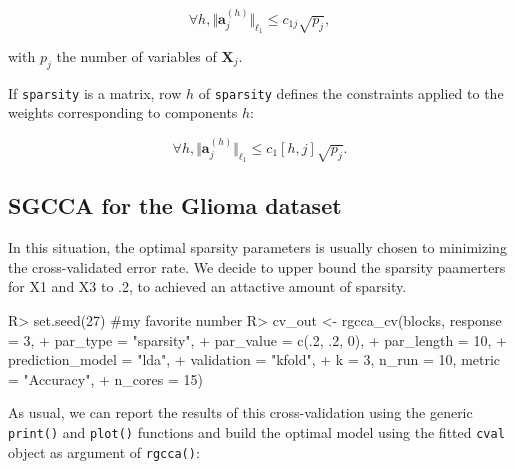 \documentclass[
]{jss}
\begin{document}
\begin{equation}
\forall h, \Vert \ensuremath{\mathbf{a}}_j^{(h)} \Vert_{\ell_1} \leq c_{1j} \sqrt{p_j},
\end{equation}

with \(p_j\) the number of variables of \(\ensuremath{\mathbf{X}}_j\).

If \texttt{sparsity} is a matrix, row \(h\) of \texttt{sparsity} defines
the constraints applied to the weights corresponding to components
\(h\):

\begin{equation}
\forall h, \Vert \ensuremath{\mathbf{a}}_j^{(h)} \Vert_{\ell_1} \leq c_1[h,j] \sqrt{p_j}.
\end{equation}

\hypertarget{sgcca-for-the-glioma-dataset}{%
\subsection{SGCCA for the Glioma
dataset}\label{sgcca-for-the-glioma-dataset}}

In this situation, the optimal sparsity parameters is usually chosen to
minimizing the cross-validated error rate. We decide to upper bound the
sparsity paamerters for X1 and X3 to .2, to achieved an attactive amount
of sparsity.

\begin{CodeChunk}
\begin{CodeInput}
R> set.seed(27) #my favorite number
R> cv_out <- rgcca_cv(blocks, response = 3, 
+                    par_type = "sparsity",
+                    par_value = c(.2, .2, 0), 
+                    par_length = 10, 
+                    prediction_model = "lda",
+                    validation = "kfold",
+                    k = 3, n_run = 10, metric = "Accuracy",
+                    n_cores = 15)
\end{CodeInput}
\end{CodeChunk}

As usual, we can report the results of this cross-validation using the
generic \texttt{print()} and \texttt{plot()} functions and build the
optimal model using the fitted \texttt{cval} object as argument of
\texttt{rgcca()}:

\footnotesize
\end{document}
